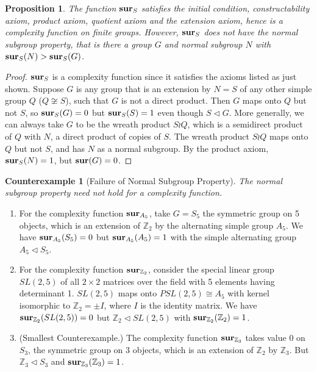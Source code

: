 \documentclass[a4paper,11pt]{amsart}
\newtheorem{proposition}[theorem]{Proposition}
\theoremstyle{definition}
\newtheorem{counterexample}[example]{Counterexample}
\newcommand{\Z}{\mathbb{Z}}
\newcommand{\1}{{\mathbf 1}}
\newcommand{\surS}{{\bf sur}}
\begin{document}
\begin{proposition}\label{surS-no-normal}
 The function $\surS_S$ satisfies the initial condition, constructability axiom, product axiom, quotient axiom and the extension axiom, hence is a complexity function on finite groups.  However, $\surS_S$ does not have the normal subgroup property, that is there  a group $G$ and normal subgroup $N$ with $\surS_S(N) > \surS_S(G)$.
\end{proposition}
 \begin{proof} $\surS_S$ is a complexity function since it satisfies the axioms listed as just shown.  Suppose $G$ is any group that is an 
 extension by $N=S$ of any other simple group $Q$ ($Q\not\cong S$), such  that $G$ is not a direct 
 product.  Then $G$ maps onto $Q$ but not $S$, so $\surS_S(G)=0$ but $\surS_S(S)=1$ even though $S\lhd G$.
 More generally, 
 we can always take $G$ to be the wreath product $S\wr Q$, which is a semidirect product of $Q$ with $N$, a direct product of copies of $S$. The wreath product $S\wr Q$ maps onto $Q$ but not $S$, and has $N$ as a normal subgroup.  
 By the product axiom,    $\surS_S(N)= 1$, but $\surS(G)=0$. 
 \end{proof}


\begin{counterexample}[Failure of  Normal Subgroup Property]
{\it The normal subgroup property need not hold for a complexity function.} 

\begin{enumerate}
 \item For the complexity function $\surS_{A_5}$, take  $G=S_5$ the symmetric group on 5 objects, which is an extension of $\Z_2$ by the alternating simple group $A_5$.  We have $\surS_{A_5}(S_5)=0$ but $\surS_{A_5}(A_5)=1$ with  the simple alternating group $A_5 \lhd S_5$.  
\item For the complexity function $\surS_{\Z_2}$, consider the special linear group $SL(2,5)$ of all $2\times 2$ matrices over the field with 5 elements having determinant 1.  
$SL(2,5)$ maps onto $PSL(2,5)\cong A_5$ with kernel isomorphic to $\Z_2 = \pm I$, where $I$ is the identity matrix. 
We have $\surS_{\Z_2}(SL(2,5))=0$ but $\Z_2 \lhd SL(2,5)$ with $\surS_{\Z_2}(\Z_2)=1$. 
\item (Smallest Counterexample.) The complexity function $\surS_{\Z_3}$ takes value 0 on $S_3$, the symmetric group on 3 objects, which is an extension of $\Z_2$ by $\Z_3$. But $\Z_3\lhd S_3$ and $\surS_{\Z_3}(\Z_3)=1$.
\end{enumerate}
\end{counterexample}
\end{document}
